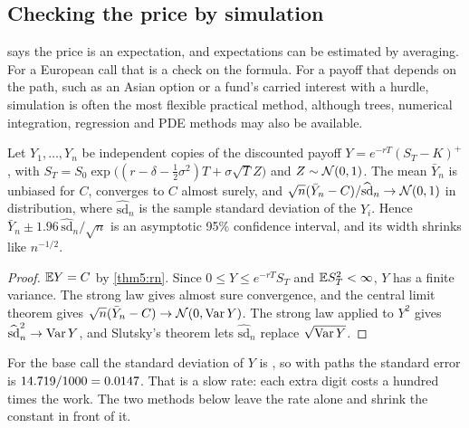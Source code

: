 \begin{chapterrefs}
\section{Checking the price by simulation}
\label{sec5:mc}

 says the price is an expectation, and expectations can be estimated by averaging. For a
European call that is a check on the formula. For a payoff that depends on the path, such as an
Asian option or a fund's carried interest with a hurdle, simulation is often the most flexible
practical method, although trees, numerical integration, regression and PDE methods may also be
available.

\begin{proposition}\label{prop5:mc}
Let $Y_1,\dots,Y_n$ be independent copies of the discounted payoff $Y=e^{-rT}(S_T-K)^+$, with
$S_T=S_0\exp\bigl((r-\delta-\tfrac12\sigma^2)T+\sigma\sqrt TZ\bigr)$ and $Z\sim\mathcal{N}(0,1)$. The mean $\bar Y_n$ is
unbiased for $C$, converges to $C$ almost surely, and
$\sqrt n(\bar Y_n-C)/\widehat{\mathrm{sd}}_n\to\mathcal{N}(0,1)$ in distribution, where $\widehat{\mathrm{sd}}_n$
is the sample standard deviation of the $Y_i$.
Hence $\bar Y_n\pm1.96\,\widehat{\mathrm{sd}}_n/\sqrt n$ is an asymptotic 95\% confidence interval, and its width shrinks
like $n^{-1/2}$.
\end{proposition}

\begin{proof}
$\mathbb{E} Y=C$ by \cref{thm5:rn}. Since $0\le Y\le e^{-rT}S_T$ and $\mathbb{E} S_T^2<\infty$, $Y$ has a finite
variance. The strong law gives almost sure convergence, and the central limit theorem gives
$\sqrt n(\bar Y_n-C)\to\mathcal{N}(0,\operatorname{Var} Y)$. The strong law applied to $Y^2$ gives $\widehat{\mathrm{sd}}_n^2\to\operatorname{Var} Y$, and
Slutsky's theorem lets $\widehat{\mathrm{sd}}_n$ replace $\sqrt{\operatorname{Var} Y}$.
\end{proof}

For the base call the standard deviation of $Y$ is \mcSdY, so with \mcBig{} paths the standard error is
$14.719/1000=0.0147$. That is a slow rate: each extra digit costs a hundred times the work.
The two methods below leave the rate alone and shrink the constant in front of it.


\end{chapterrefs}
